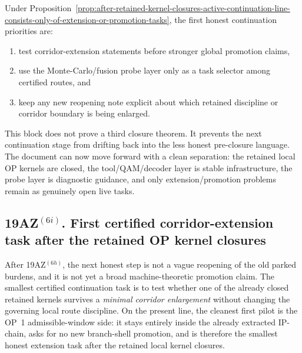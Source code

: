 \begin{corollary}
\label{cor:first-normalized-continuation-priorities-after-retained-op-kernel-closures}
Under Proposition~\ref{prop:after-retained-kernel-closures-active-continuation-line-consists-only-of-extension-or-promotion-tasks}, the first honest continuation priorities are:
\begin{enumerate}[leftmargin=2em,label=(\alph*)]
 \item test corridor-extension statements before stronger global promotion claims,
 \item use the Monte-Carlo/fusion probe layer only as a task selector among certified routes, and
 \item keep any new reopening note explicit about which retained discipline or corridor boundary is being enlarged.
\end{enumerate}
\end{corollary}

\begin{remark}
\label{rem:what-joint-post-closure-synthesis-buys}
This block does not prove a third closure theorem. It prevents the next continuation stage from drifting back into the less honest pre-closure language. The document can now move forward with a clean separation: the retained local OP kernels are closed, the tool/QAM/decoder layer is stable infrastructure, the probe layer is diagnostic guidance, and only extension/promotion problems remain as genuinely open live tasks.
\end{remark}


\subsection*{19AZ$^{(6i)}$. First certified corridor-extension task after the retained OP kernel closures}
\label{sec:first-certified-corridor-extension-task-after-retained-op-kernel-closures}
After 19AZ$^{(6h)}$, the next honest step is not a vague reopening of the old parked burdens, and it is not yet a broad machine-theoretic promotion claim. The smallest certified continuation task is to test whether one of the already closed retained kernels survives a \emph{minimal corridor enlargement} without changing the governing local route discipline. On the present line, the cleanest first pilot is the OP~1 admissible-window side: it stays entirely inside the already extracted IP-chain, asks for no new branch-shell promotion, and is therefore the smallest honest extension task after the retained local kernel closures.

